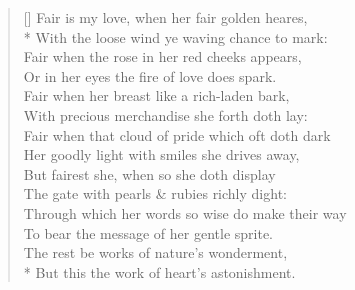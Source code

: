 \documentclass[MAIN]{subfiles}
\begin{document}
\settowidth{\versewidth}{Fair is my love, when her fair golden heares,}
\begin{verse}[\versewidth]
Fair is my love, when her fair golden heares,\\* 
With the loose wind ye waving chance to mark:\\
Fair when the rose in her red cheeks appears,\\
Or in her eyes the fire of love does spark.\\
Fair when her breast like a rich-laden bark,\\
With precious merchandise she forth doth lay:\\
Fair when that cloud of pride which oft doth dark\\
Her goodly light with smiles she drives away,\\
But fairest she, when so she doth display\\
The gate with pearls \& rubies richly dight:\\ 
Through which her words so wise do make their way\\
To bear the message of her gentle sprite.\\
The rest be works of nature's wonderment,\\*
But this the work of heart's astonishment.
\end{verse}
\end{document}
